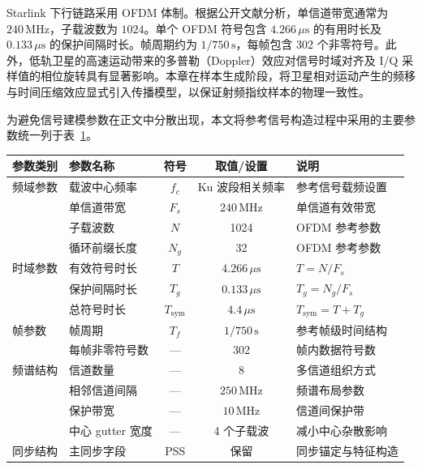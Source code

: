 Starlink 下行链路采用 OFDM 体制。根据公开文献分析，单信道带宽通常为 $240\,\text{MHz}$，子载波数为 $1024$。单个 OFDM 符号包含 $4.266\,\mu\text{s}$ 的有用时长及 $0.133\,\mu\text{s}$ 的保护间隔时长。帧周期约为 $1/750\,\text{s}$，每帧包含 302 个非零符号。此外，低轨卫星的高速运动带来的多普勒（Doppler）效应对信号时域对齐及 I/Q 采样值的相位旋转具有显著影响。本章在样本生成阶段，将卫星相对运动产生的频移与时间压缩效应显式引入传播模型，以保证射频指纹样本的物理一致性。

为避免信号建模参数在正文中分散出现，本文将参考信号构造过程中采用的主要参数统一列于表~\ref{tab:signal_params_ch3}。

\begin{table}[htbp]
    \centering
    \label{tab:signal_params_ch3}
    \begin{tabular}{@{}llccl@{}}
        \toprule
        \textbf{参数类别} & \textbf{参数名称} & \textbf{符号} & \textbf{取值/设置} & \textbf{说明} \\ \midrule
        频域参数 & 载波中心频率 & $f_c$ & Ku 波段相关频率 & 参考信号载频设置 \\
        & 单信道带宽 & $F_s$ & $240\,\text{MHz}$ & 单信道有效带宽 \\
        & 子载波数 & $N$ & 1024 & OFDM 参考参数 \\
        & 循环前缀长度 & $N_g$ & 32 & OFDM 参考参数 \\
        时域参数 & 有效符号时长 & $T$ & $4.266\,\mu\text{s}$ & $T=N/F_s$ \\
        & 保护间隔时长 & $T_g$ & $0.133\,\mu\text{s}$ & $T_g=N_g/F_s$ \\
        & 总符号时长 & $T_{\mathrm{sym}}$ & $4.4\,\mu\text{s}$ & $T_{\mathrm{sym}}=T+T_g$ \\
        帧参数 & 帧周期 & $T_f$ & $1/750\,\text{s}$ & 参考帧级时间结构 \\
        & 每帧非零符号数 & — & 302 & 帧内数据符号数 \\
        频谱结构 & 信道数量 & — & 8 & 多信道组织方式 \\
        & 相邻信道间隔 & — & $250\,\text{MHz}$ & 频谱布局参数 \\
        & 保护带宽 & — & $10\,\text{MHz}$ & 信道间保护带 \\
        & 中心 gutter 宽度 & — & 4 个子载波 & 减小中心杂散影响 \\
        同步结构 & 主同步字段 & PSS & 保留 & 同步锚定与特征构造 \\

\end{tabular}
\end{table}

